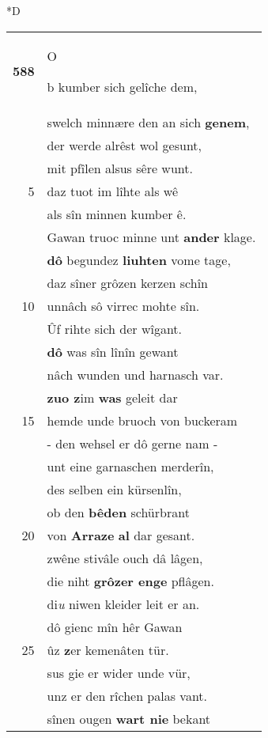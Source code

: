 \documentclass[8pt,a4paper,notitlepage]{article}
\begin{document}
\begin{table}[ht]
\begin{minipage}[t]{0.5\linewidth}
\small
\begin{center}*D
\end{center}
\begin{tabular}{rl}
\textbf{588} & \begin{large}O\end{large}b kumber sich gelîche dem,\\ 
 & swelch minnære den an sich \textbf{genem},\\ 
 & der werde alrêst wol gesunt,\\ 
 & mit pfîlen alsus sêre wunt.\\ 
5 & daz tuot im lîhte als wê\\ 
 & als sîn minnen kumber ê.\\ 
 & Gawan truoc minne unt \textbf{ander} klage.\\ 
 & \textbf{dô} begundez \textbf{liuhten} vome tage,\\ 
 & daz sîner grôzen kerzen schîn\\ 
10 & unnâch sô virrec mohte sîn.\\ 
 & Ûf rihte sich der wîgant.\\ 
 & \textbf{dô} was sîn lînîn gewant\\ 
 & nâch wunden und harnasch var.\\ 
 & \textbf{zuo z}im \textbf{was} geleit dar\\ 
15 & hemde unde bruoch von buckeram\\ 
 & - den wehsel er dô gerne nam -\\ 
 & unt eine garnaschen merderîn,\\ 
 & des selben ein kürsenlîn,\\ 
 & ob den \textbf{bêden} schürbrant\\ 
20 & von \textbf{Arraze} \textbf{al} dar gesant.\\ 
 & zwêne stivâle ouch dâ lâgen,\\ 
 & die niht \textbf{grôzer enge} pflâgen.\\ 
 & di\textit{u} niwen kleider leit er an.\\ 
 & dô gienc mîn hêr Gawan\\ 
25 & ûz \textbf{z}er kemenâten tür.\\ 
 & sus gie er wider unde vür,\\ 
 & unz er den rîchen palas vant.\\ 
 & sînen ougen \textbf{wart nie} bekant\\ 

\end{tabular}
\end{minipage}
\end{table}
\end{document}
